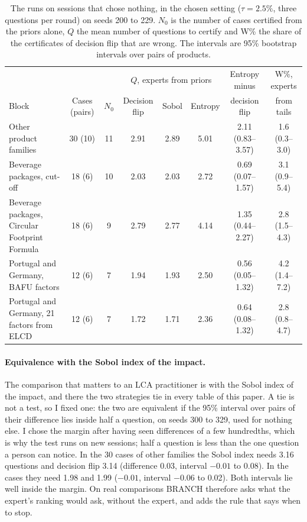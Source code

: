 \documentclass{article}
\begin{document}
\begin{table}[t]
\centering
\small
\setlength{\tabcolsep}{4.5pt}
\begin{tabular}{lccccccc}
\toprule
& & & \multicolumn{3}{c}{$Q$, experts from priors} & Entropy minus & W\%, experts \\
Block & Cases (pairs) & $N_0$ & Decision flip & Sobol & Entropy & decision flip & from tails \\
\midrule
Other product families & 30 (10) & 11 & 2.91 & 2.89 & 5.01 & 2.11 (0.83--3.57) & 1.6 (0.3--3.0) \\
Beverage packages, cut-off & 18 (6) & 10 & 2.03 & 2.03 & 2.72 & 0.69 (0.07--1.57) & 3.1 (0.9--5.4) \\
Beverage packages, Circular Footprint Formula & 18 (6) & 9 & 2.79 & 2.77 & 4.14 & 1.35 (0.44--2.27) & 2.8 (1.5--4.3) \\
\midrule
Portugal and Germany, BAFU factors & 12 (6) & 7 & 1.94 & 1.93 & 2.50 & 0.56 (0.05--1.32) & 4.2 (1.4--7.2) \\
Portugal and Germany, 21 factors from ELCD & 12 (6) & 7 & 1.72 & 1.71 & 2.36 & 0.64 (0.08--1.32) & 2.8 (0.8--4.7) \\
\bottomrule
\end{tabular}
\caption{The runs on sessions that chose nothing, in the chosen setting ($\tau=2.5\%$, three questions per
round) on seeds 200 to 229. $N_0$ is the number of cases certified from the priors alone, $Q$ the mean
number of questions to certify and W\% the share of the certificates of decision flip that are wrong. The
intervals are 95\% bootstrap intervals over pairs of products.}
\label{tab:v02}
\end{table}

\paragraph{Equivalence with the Sobol index of the impact.}
The comparison that matters to an LCA practitioner is with the Sobol index of the impact, and there the
two strategies tie in every table of this paper. A tie is not a test, so I fixed one: the two are
equivalent if the 95\% interval over pairs of their difference lies inside half a question, on seeds 300
to 329, used for nothing else. I chose the margin after having seen differences of a few hundredths, which
is why the test runs on new sessions; half a question is less than the one question a person can notice.
In the 30 cases of other families the Sobol index needs 3.16 questions and decision flip 3.14 (difference
0.03, interval $-0.01$ to 0.08). In the \nCases{} cases they need 1.98 and 1.99 ($-0.01$, interval $-0.06$
to 0.02). Both intervals lie well inside the margin. On real comparisons BRANCH therefore asks what the
expert's ranking would ask, without the expert, and adds the rule that says when to stop.
\end{document}
